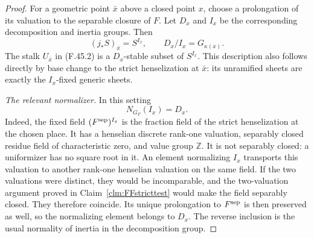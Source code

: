 \documentclass[11pt]{article}
\begin{document}
\begin{proof}
For a geometric point \(\bar x\) above a closed point
\(x\), choose a prolongation of its valuation to the
separable closure of \(F\). Let \(D_x\) and \(I_x\)
be the corresponding decomposition and inertia groups.
Then
\[
               (j_*S)_{\bar x}=S^{I_x},\qquad
               D_x/I_x=G_{\kappa(x)}.
                                                        \tag{F.45.3}
\]
The stalk \(U_{\bar x}\) in (F.45.2) is a
\(D_x\)-stable subset of \(S^{I_x}\). This description
also follows directly by base change to the strict
henselization at \(\bar x\): its unramified sheets are
exactly the \(I_x\)-fixed generic sheets.

\emph{The relevant normalizer.}
In this setting
\[
                            N_{G_F}(I_x)=D_x.
                                                        \tag{F.45.4}
\]
Indeed, the fixed field \((F^{\rm sep})^{I_x}\) is the
fraction field of the strict henselization at the chosen
place. It has a henselian discrete rank-one valuation,
separably closed residue field of characteristic zero,
and value group \(\mathbb Z\). It is not separably
closed: a uniformizer has no square root in it. An element
normalizing \(I_x\) transports this valuation to another
rank-one henselian valuation on the same field. If the
two valuations were distinct, they would be incomparable,
and the two-valuation argument proved in
Claim~\ref{clm:FFstricttest} would make the field separably
closed. They therefore coincide. Its unique prolongation
to \(F^{\rm sep}\) is then preserved as well, so the
normalizing element belongs to \(D_x\). The reverse
inclusion is the usual normality of inertia in the
decomposition group.


\end{proof}
\end{document}
